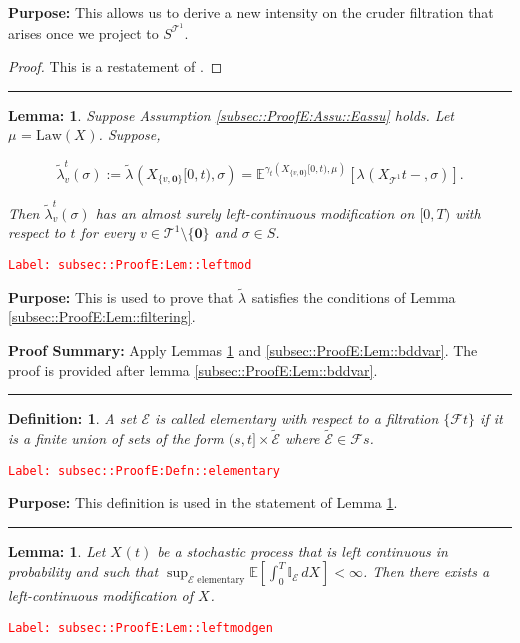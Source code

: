 \documentclass[12pt]{article}
\newcommand{\mb}{\mathbb}
\newcommand{\mc}{\mathcal}
\newcommand{\te}{\text}
\newcommand{\tr}{\textcolor{red}}
\newcommand{\labe}[1]{\tr{\texttt{Label: #1}}}
\newcommand{\purpose}{\textbf{Purpose: }}
\newcommand{\pfsum}{\textbf{Proof Summary: }}
\newcommand{\lin}{\rule{\linewidth}{0.4 pt}}
\newcommand{\ex}[1]{\mb{E}\left[#1\right]}			%
\newcommand{\exmu}[2]{\mb{E}^{#1}\left[#2\right]}	%
\renewcommand{\root}{\mathbf{0}}				%
\renewcommand{\v}{v}							%
\renewcommand{\S}{S}							%
\newcommand{\s}{\sigma}							%
\newcommand{\T}{T}								%
\renewcommand{\t}{t}							%
\renewcommand{\tt}{s}							%
\newcommand{\F}{\mc{F}}							%
\newcommand{\law}{\te{Law}}							%
\newcommand{\pup}[1]{^{#1}}							%
\newcommand{\tree}{\mc{T}}							%
\newcommand{\rxvt}[2]{X_{#1}{(#2)}}					%
\newcommand{\rxvts}[2]{X_{#1}{#2}}					%
\newcommand{\m}[3]{\mu_{#2#1}^{#3}}						%
\newcommand{\cm}{\gamma}							%
\newcommand{\rate}[1]{\lambda_{#1}}					%
\newcommand{\crate}[2]{\alt{\lambda}_{#1}^{#2}}		%
\newcommand{\alt}{\widetilde}						%
\newcommand{\evnt}{\mc{E}}						%
\newtheorem{lem}[thms]{Lemma: }
\newtheorem{defn}[thms]{Definition: }
\begin{document}
\purpose This allows us to derive a new intensity on the cruder filtration that arises once we project to \(\S^{\tree^1}\).

\begin{proof}
This is a restatement of \cite[Theorem 14.3.III]{DalVer08}.
\end{proof}

\lin

\begin{lem}
Suppose Assumption \ref{subsec::ProofE:Assu::Eassu} holds. Let \(\m{}{}{} = \law(\rxvts{}{})\). Suppose,

\[\crate{\v}{\t}(\s) := \crate{}{}(\rxvts{\{\v,\root\}}{[0,\t)},\s) = \exmu{\cm_\t(\rxvts{\{\v,\root\}}{[0,\t)},\m{}{}{})}{\rate{}(\rxvts{\tree\pup{1}}{\t-},\s)}.\]


Then \(\crate{\v}{\t}(\s)\) has an almost surely left-continuous modification on \([0,\T)\) with respect to \(\t\) for every \(\v \in \tree\pup{1}\setminus\{\root\}\) and \(\s \in \S\).
\label{subsec::ProofE:Lem::leftmod}
\end{lem}
\labe{subsec::ProofE:Lem::leftmod}

\purpose This is used to prove that \(\crate{}{}\) satisfies the conditions of Lemma \ref{subsec::ProofE:Lem::filtering}.

\pfsum Apply Lemmas \ref{subsec::ProofE:Lem::leftmodgen} and \ref{subsec::ProofE:Lem::bddvar}. The proof is provided after lemma \ref{subsec::ProofE:Lem::bddvar}.

\lin

\begin{defn}
A set \(\evnt\) is called elementary with respect to a filtration \(\{\F{}{\t}\}\) if it is a finite union of sets of the form \((\tt,\t]\times \alt{\evnt}\) where \(\alt{\evnt} \in \F{}{\tt}\).
\label{subsec::ProofE:Defn::elementary}
\end{defn}
\labe{subsec::ProofE:Defn::elementary}

\purpose This definition is used in the statement of Lemma \ref{subsec::ProofE:Lem::leftmodgen}.

\lin

\begin{lem}
Let \(\rxvt{}{\t}\) be a stochastic process that is left continuous in probability and such that \(\sup_{\evnt\te{ elementary}}\ex{\int_0^\T \mb{I}_\evnt\,d\rxvts{}{}} < \infty\). Then there exists a left-continuous modification of \(\rxvts{}{}\).
\label{subsec::ProofE:Lem::leftmodgen}
\end{lem}
\labe{subsec::ProofE:Lem::leftmodgen}
\end{document}
